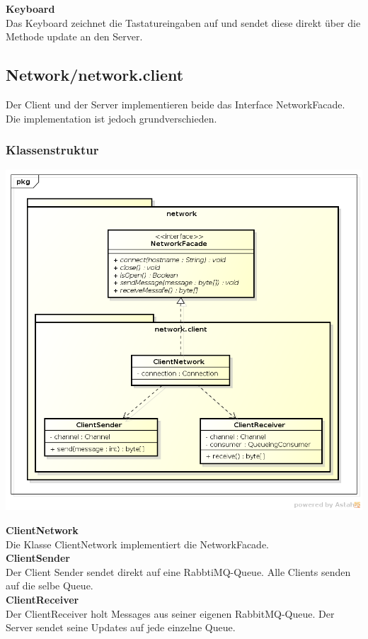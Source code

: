 \documentclass[11pt]{scrartcl}
\begin{document}
\textbf{Keyboard}\\
Das Keyboard zeichnet die Tastatureingaben auf und sendet diese direkt über die Methode update an den Server.

\newpage

\subsection{Network/network.client}

Der Client und der Server implementieren beide das Interface NetworkFacade. Die implementation ist jedoch grundverschieden.

\subsubsection{Klassenstruktur}
\includegraphics[scale=0.5]{ClassDiagramNetworkClient}

\textbf{ClientNetwork}\\
Die Klasse ClientNetwork implementiert die NetworkFacade.\\

\textbf{ClientSender}\\
Der Client Sender sendet direkt auf eine RabbtiMQ-Queue. Alle Clients senden auf die selbe Queue.\\

\textbf{ClientReceiver}\\
Der ClientReceiver holt Messages aus seiner eigenen RabbitMQ-Queue. Der Server sendet seine Updates auf jede einzelne Queue.
\end{document}
